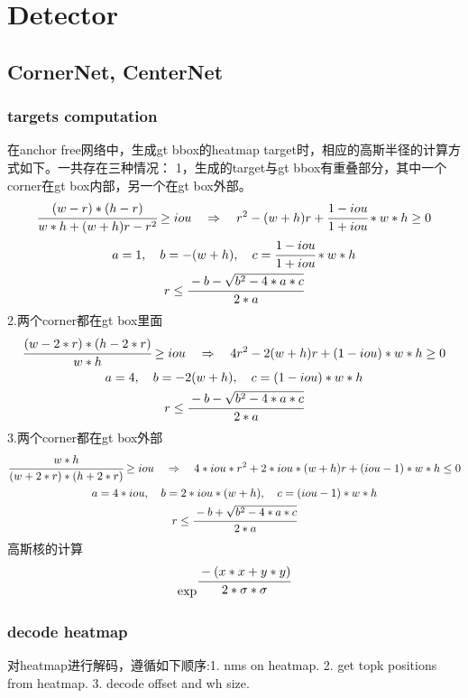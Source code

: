 \documentclass{article}
\begin{document}
\section{Detector}
\subsection{CornerNet, CenterNet}
\subsubsection{targets computation}
在anchor free网络中，生成gt bbox的heatmap target时，相应的高斯半径的计算方式如下。一共存在三种情况：
1，生成的target与gt bbox有重叠部分，其中一个corner在gt box内部，另一个在gt box外部。
\begin{gather}
        \cfrac{(w-r)*(h-r)}{w*h+(w+h)r-r^2} \ge {iou} \quad\Rightarrow\quad
        {r^2-(w+h)r+\cfrac{1-iou}{1+iou}*w*h} \ge 0 \\
        {a} = 1,\quad{b} = {-(w+h)},\quad{c} = {\cfrac{1-iou}{1+iou}*w*h} \\
        {r} \le \cfrac{-b-\sqrt{b^2-4*a*c}}{2*a}
\end{gather}
2.两个corner都在gt box里面
\begin{gather}
\cfrac{(w-2*r)*(h-2*r)}{w*h} \ge {iou} \quad\Rightarrow\quad
        {4r^2-2(w+h)r+(1-iou)*w*h} \ge 0 \\
        {a} = 4,\quad {b} = {-2(w+h)},\quad {c} = {(1-iou)*w*h} \\
        {r} \le \cfrac{-b-\sqrt{b^2-4*a*c}}{2*a}
\end{gather}
3.两个corner都在gt box外部
\begin{gather}
\cfrac{w*h}{(w+2*r)*(h+2*r)} \ge {iou} \quad\Rightarrow\quad
        {4*iou*r^2+2*iou*(w+h)r+(iou-1)*w*h} \le 0 \\
        {a} = {4*iou},\quad {b} = {2*iou*(w+h)},\quad {c} = {(iou-1)*w*h} \\
        {r} \le \cfrac{-b+\sqrt{b^2-4*a*c}}{2*a}
\end{gather}
高斯核的计算
\begin{align}
\exp^{\cfrac{-(x*x+y*y)}{2*\sigma*\sigma}}
\end{align}

\subsubsection{decode heatmap}
对heatmap进行解码，遵循如下顺序:1. nms on heatmap. 2. get topk positions from heatmap. 3. decode offset and wh size.
\end{document}
